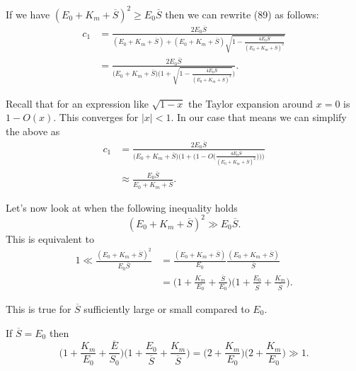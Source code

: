 \documentclass[12pt]{article}
\begin{document}
If we have $(E_0 + K_m + \overline{S})^2 \geq E_0 \overline{S}$ then
we can rewrite (89) as follows:
\begin{align}
  c_1 &= \frac{2 E_0 \overline{S}}
              {(E_0 + K_m + \overline{S}) + (E_0 + K_m + \overline{S})
              \sqrt{1- \frac{4 E_0 \overline{S}}
                            {(E_0 + K_m + \overline{S})^2}}} \\
      &= \frac{2 E_0 \overline{S}}
              {\Big(E_0 + K_m + \overline{S}\Big)
              \Big(1 + \sqrt{1- \frac{4 E_0 \overline{S}}
                  {(E_0 + K_m + \overline{S})^2}}\Big)}.
\end{align}

Recall that for an expression like $\sqrt{1-x}$ the Taylor expansion
around $x=0$ is $1 - O(x)$. This converges for $|x| < 1$. In our case
that means we can simplify the above as
\begin{align}
   c_1 &= \frac{2 E_0 \overline{S}}
              {\Big(E_0 + K_m + \overline{S}\Big)
               \Big(1 + \Big(1 -
                O\Big(\frac{4 E_0 \overline{S}}
                           {(E_0 + K_m + \overline{S})^2}\Big)\Big)\Big)} \\
      &\approx \frac{E_0 \overline{S}}
                    {E_0 + K_m + \overline{S}}.
\end{align}

Let's now look at when the following inequality holds
\begin{equation}
(E_0 + K_m + \overline{S})^2 \gg E_0 \overline{S}.
\end{equation}
This is equivalent to
\begin{align}
1 \ll
  \frac{(E_0 + K_m + \overline{S})^2}
           {E_0 \overline{S}} &= 
\frac{(E_0 + K_m + \overline{S})}
      {E_0} \frac{(E_0 + K_m + \overline{S})}{\overline{S}} \\
&= \Big(1 + \frac{K_m}{E_0} + \frac{\overline{S}}{E_0}\Big)
   \Big(1 + \frac{E_0}{\overline{S}} + \frac{K_m}{\overline{S}}\Big).
\end{align}

This is true for $\overline{S}$ sufficiently large or small compared
to $E_0$.

If $\overline{S} = E_0$ then
\begin{equation}
\Big(1 + \frac{K_m}{E_0} + \frac{\overline{E}}{S_0}\Big)\Big(1 + \frac{E_0}{\overline{S}} + \frac{K_m}{\overline{S}}\Big) = \Big(2 + \frac{K_m}{E_0}\Big) \Big(2 + \frac{K_m}{E_0}\Big) \gg 1.
\end{equation}
\end{document}
